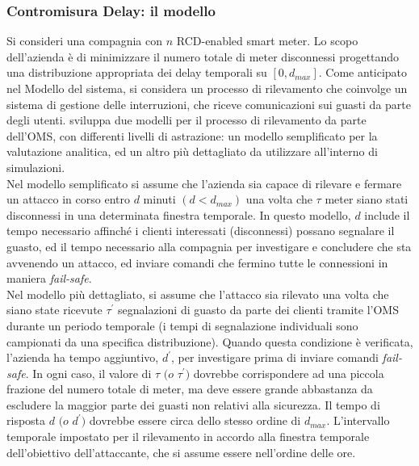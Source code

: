 \subsubsection{Contromisura Delay: il modello}
Si consideri una compagnia con $n$ RCD-enabled smart meter. Lo scopo dell'azienda è di minimizzare il numero totale di meter disconnessi progettando una distribuzione appropriata dei delay temporali su $[0, d_{max}]$. Come anticipato nel Modello del sistema, si considera un processo di rilevamento che coinvolge un sistema di gestione delle interruzioni, che riceve comunicazioni sui guasti da parte degli utenti. \cite{delay} sviluppa due modelli per il processo di rilevamento da parte dell'OMS, con differenti livelli di astrazione: un modello semplificato per la valutazione analitica, ed un altro più dettagliato da utilizzare all'interno di simulazioni.\\
Nel modello semplificato si assume che l'azienda sia capace di rilevare e fermare un attacco in corso entro $d$ minuti $(d < d_{max})$ una volta che $\tau$ meter siano stati disconnessi in una determinata finestra temporale. In questo modello, $d$ include il tempo necessario affinché i clienti interessati (disconnessi) possano segnalare il guasto, ed il tempo necessario alla compagnia per investigare e concludere che sta avvenendo un attacco, ed inviare comandi che fermino tutte le connessioni in maniera \emph{fail-safe}.\\
Nel modello più dettagliato, si assume che l'attacco sia rilevato una volta che siano state ricevute $\tau^\prime$ segnalazioni di guasto da parte dei clienti tramite l'OMS durante un periodo temporale (i tempi di segnalazione individuali sono campionati da una specifica distribuzione).
Quando questa condizione è verificata, l'azienda ha tempo aggiuntivo, $d^\prime$, per investigare prima di inviare comandi \emph{fail-safe}. In ogni caso, il valore di $\tau$ $(o$ $\tau^\prime)$ dovrebbe corrispondere ad una piccola frazione del numero totale di meter, ma deve essere grande abbastanza da escludere la maggior parte dei guasti non relativi alla sicurezza. Il tempo di risposta $d$ $(o$ $d^\prime)$ dovrebbe essere circa dello stesso ordine di $d_{max}$. L'intervallo temporale impostato per il rilevamento in accordo alla finestra temporale dell'obiettivo dell'attaccante, che si assume essere nell'ordine delle ore.

